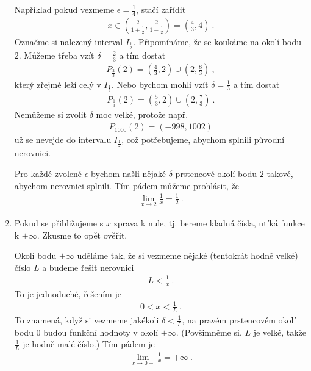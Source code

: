 \begin{example}
\begin{enumerate}[label=(\roman*)]
        Například pokud vezmeme $\epsilon = \frac{1}{4}$, stačí zařídit
        \begin{align}
            x \in \left( \frac{2}{1 + \frac{1}{2}}, \frac{2}{1 - \frac{1}{2}} \right)
            = \left( \frac{4}{3}, 4 \right) \:.
        \end{align}
        Označme si nalezený interval $I_\frac{1}{2}$. Připomínáme, že se koukáme na okolí bodu $2$. Můžeme třeba vzít $\delta = \frac{2}{3}$ a tím dostat 
        \begin{align}
            P_{\frac{2}{3}}(2) = \left( \frac{4}{3}, 2 \right) \cup \left( 2, \frac{8}{3} \right) \:,
        \end{align}
        který zřejmě leží celý v $I_\frac{1}{2}$. Nebo bychom mohli vzít $\delta = \frac{1}{3}$ a tím dostat 
        \begin{align}
            P_{\frac{1}{3}}(2) = \left( \frac{5}{3}, 2 \right) \cup \left( 2, \frac{7}{3} \right) \:.
        \end{align}
        Nemůžeme si zvolit $\delta$ moc velké, protože např.
        \begin{align}
            P_{1000}(2) = (-998,1002)
        \end{align}
        už se nevejde do intervalu $I_\frac{1}{2}$, což potřebujeme, abychom splnili původní nerovnici.

        Pro každé zvolené $\epsilon$ bychom našli nějaké $\delta$-prstencové okolí bodu $2$ takové, abychom nerovnici splnili. Tím pádem můžeme prohlásit, že
        \begin{align}
            \lim_{x \rightarrow 2} \frac{1}{x} = \frac{1}{2} \:.
        \end{align}

        \item Pokud se přibližujeme s $x$ zprava k nule, tj. bereme kladná čísla, utíká funkce k $+\infty$. Zkusme to opět ověřit.
        
        Okolí bodu $+\infty$ uděláme tak, že si vezmeme nějaké (tentokrát hodně velké) číslo $L$ a budeme řešit nerovnici
        \begin{align}
            L < \frac{1}{x} \:.
        \end{align}
        To je jednoduché, řešením je
        \begin{align}
           0 < x < \frac{1}{L} \:.
        \end{align}
        To znamená, když si vezmeme jakékoli $\delta < \frac{1}{L}$, na pravém prstencovém okolí bodu $0$ budou funkční hodnoty v okolí $+\infty$. (Povšimněme si, $L$ je velké, takže $\frac{1}{L}$ je hodně malé číslo.) Tím pádem je
        \begin{align}
            \lim_{x \rightarrow 0+} \frac{1}{x} = + \infty \:.
        \end{align}


\end{enumerate}
\end{example}

